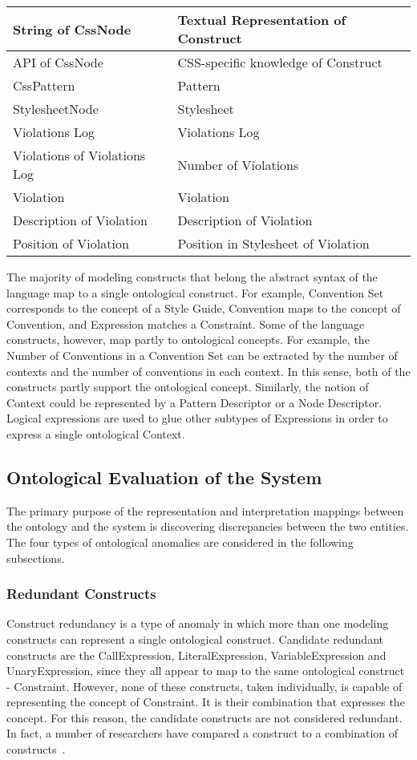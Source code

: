 \documentclass[parskip=full]{uvamscse}
\begin{document}
\begin{center}
\begin{longtable}{ | p{20em} | p{20em} | }
String of CssNode & Textual Representation of Construct \\ \hline
API of CssNode & CSS-specific knowledge of Construct \\ \hline
CssPattern & Pattern \\ \hline
StylesheetNode & Stylesheet \\ \hline
Violations Log & Violations Log \\ \hline
Violations of Violations Log & Number of Violations \\ \hline
Violation & Violation \\ \hline
Description of Violation & Description of Violation \\ \hline
Position of Violation & Position in Stylesheet of Violation \\ \hline
\end{longtable}
\end{center}


The majority of modeling constructs that belong the abstract syntax of the language map to a single
ontological construct. For example, Convention Set corresponds to the concept of a Style Guide,
Convention maps to the concept of Convention, and Expression matches a Constraint. Some of the
language constructs, however, map partly to ontological concepts. For example, the Number of
Conventions in a Convention Set can be extracted by the number of contexts and the number of
conventions in each context. In this sense, both of the constructs partly support the ontological
concept. Similarly, the notion of Context could be represented by a Pattern Descriptor or a Node
Descriptor. Logical expressions are used to glue other subtypes of Expressions in order to express a
single ontological Context.

\subsection{Ontological Evaluation of the System}

The primary purpose of the representation and interpretation mappings between the ontology and the
system is discovering discrepancies between the two entities. The four types of ontological
anomalies are considered in the following subsections.

\subsubsection{Redundant Constructs} 

Construct redundancy is a type of anomaly in which more than one modeling constructs can represent a
single ontological construct. Candidate redundant constructs are the CallExpression,
LiteralExpression, VariableExpression and UnaryExpression, since they all appear to map to the same
ontological construct - Constraint. However, none of these constructs, taken individually, is
capable of representing the concept of Constraint. It is their combination that expresses the
concept. For this reason, the candidate constructs are not considered redundant. In fact, a number
of researchers have compared a construct to a combination of constructs~\cite{gehlert2007toward}.
\end{document}
